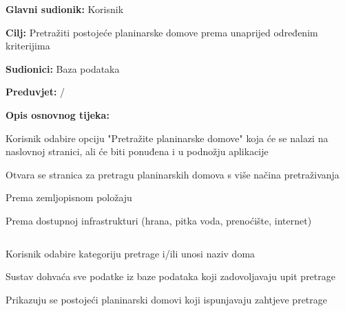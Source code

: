 		
			\noindent {}
		\begin{packed_item}
			
			\item \textbf{Glavni sudionik: }$ $Korisnik$ $
			\item  \textbf{Cilj:} $ $Pretražiti postojeće planinarske domove prema unaprijed određenim kriterijima$ $
			\item  \textbf{Sudionici:} $ $Baza podataka$ $
			\item  \textbf{Preduvjet:} $ $/$ $
			\item  \textbf{Opis osnovnog tijeka:}
			
			\item[] \begin{packed_enum}
				
				\item $ $Korisnik odabire opciju "Pretražite planinarske domove" koja će se nalazi na naslovnoj stranici, ali će biti ponuđena i u podnožju aplikacije$  $
				\item $ $Otvara se stranica za pretragu planinarskih domova s više načina pretraživanja$ $
				\begin{packed_enum}
					\item Prema zemljopisnom položaju
					\item Prema dostupnoj infrastrukturi (hrana, pitka voda, prenoćište, internet)
				\end{packed_enum}$ $
				\item $ $Korisnik odabire kategoriju pretrage i/ili unosi naziv doma $ $
				\item $ $Sustav dohvaća sve podatke iz baze podataka koji zadovoljavaju upit pretrage $ $
				\item $ $Prikazuju se postojeći planinarski domovi koji ispunjavaju zahtjeve pretrage$ $
				
			\end{packed_enum}
		\end{packed_item}
	
